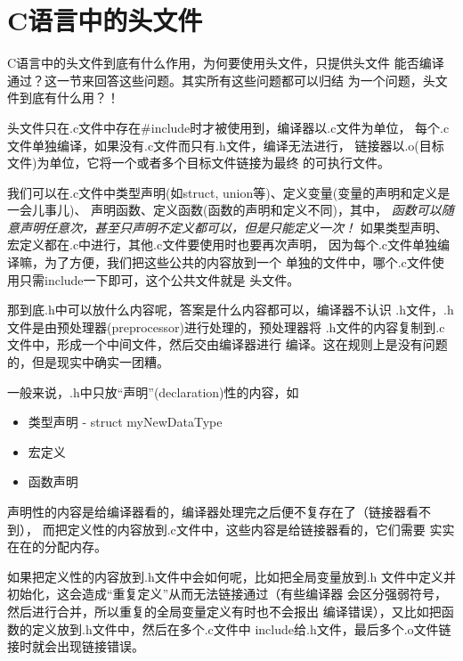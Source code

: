 ﻿\section[header file in pure C]{C语言中的头文件}
C语言中的头文件到底有什么作用，为何要使用头文件，只提供头文件
能否编译通过？这一节来回答这些问题。其实所有这些问题都可以归结
为一个问题，头文件到底有什么用？！

头文件只在.c文件中存在\#include时才被使用到，编译器以.c文件为单位，
每个.c文件单独编译，如果没有.c文件而只有.h文件，编译无法进行，
链接器以.o(目标文件)为单位，它将一个或者多个目标文件链接为最终
的可执行文件。

我们可以在.c文件中类型声明(如struct, union等)、定义变量(变量的声明和定义是一会儿事儿)、
声明函数、定义函数(函数的声明和定义不同)，其中，
\emph{函数可以随意声明任意次，甚至只声明不定义都可以，但是只能定义一次！}
如果类型声明、宏定义都在.c中进行，其他.c文件要使用时也要再次声明，
因为每个.c文件单独编译嘛，为了方便，我们把这些公共的内容放到一个
单独的文件中，哪个.c文件使用只需include一下即可，这个公共文件就是
头文件。

那到底.h中可以放什么内容呢，答案是什么内容都可以，编译器不认识
.h文件，.h文件是由预处理器(preprocessor)进行处理的，预处理器将
.h文件的内容复制到.c文件中，形成一个中间文件，然后交由编译器进行
编译。这在规则上是没有问题的，但是现实中确实一团糟。

一般来说，.h中只放“声明”(declaration)性的内容，如
\begin{itemize}
  \item 类型声明 - struct myNewDataType {}
  \item 宏定义
  \item 函数声明
\end{itemize}
声明性的内容是给编译器看的，编译器处理完之后便不复存在了（链接器看不到），
而把定义性的内容放到.c文件中，这些内容是给链接器看的，它们需要
实实在在的分配内存。

如果把定义性的内容放到.h文件中会如何呢，比如把全局变量放到.h
文件中定义并初始化，这会造成“重复定义”从而无法链接通过（有些编译器
会区分强弱符号，然后进行合并，所以重复的全局变量定义有时也不会报出
编译错误），又比如把函数的定义放到.h文件中，然后在多个.c文件中
include给.h文件，最后多个.o文件链接时就会出现链接错误。

